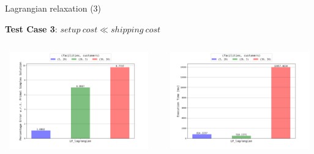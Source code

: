 \documentclass{beamer}
\begin{document}
	    \begin{frame}{Lagrangian relaxation (3)}
	    
        \textbf{Test Case 3}: $setup \ cost \ll shipping \ cost$
        
        
        \begin{columns}
	   \centering
        \includegraphics[width=6.5cm,height=4.2cm]{img/chart_error_lagrangian_2.png}
        
        \centering
        \includegraphics[width=6.5cm,height=4.2cm]{img/chart_time_lagrangian_2.png}
        \end{columns}
        
	    \end{frame}
	    
\end{document}
